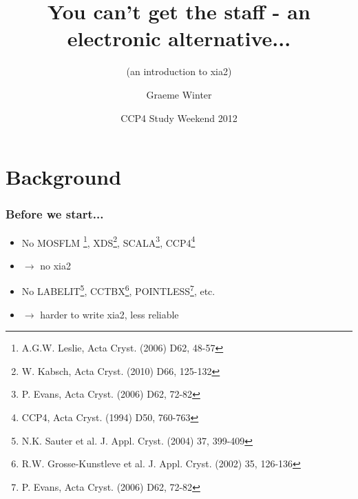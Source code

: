 \documentclass[slides,compress]{beamer}
\title{\huge You can't get the staff - an electronic alternative...}
\subtitle{\large (an introduction to xia2)}
\author{Graeme Winter}
\institute{Diamond Light Source}
\date{CCP4 Study Weekend 2012}
\begin{document}

\frame{\maketitle}


\section{Background}

\begin{frame}
\frametitle{Before we start...}
\begin{itemize}
\item{No 
MOSFLM \footnote{A.G.W. Leslie, Acta Cryst. (2006) D62, 48-57},
XDS\footnote{W. Kabsch, Acta Cryst. (2010) D66, 125-132}, 
SCALA\footnote{P. Evans, Acta Cryst. (2006) D62, 72-82}, 
CCP4\footnote{CCP4, Acta Cryst. (1994) D50, 760-763}
}
\item{$\rightarrow$ no xia2}
\item{No 
LABELIT\footnote{N.K. Sauter et al.
J. Appl. Cryst. (2004) 37, 399-409},
CCTBX\footnote{R.W. Grosse-Kunstleve et al.
J. Appl. Cryst. (2002) 35, 126-136},
POINTLESS\footnote{P. Evans, Acta Cryst. (2006) D62, 72-82}, 
etc.}
\item{$\rightarrow$ harder to write xia2, less reliable}
\end{itemize}
\end{frame}
\end{document}
